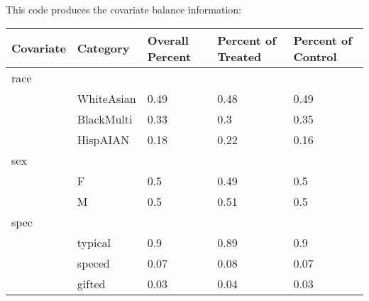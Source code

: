 \documentclass{article}
\begin{document}
This code produces the covariate balance information:
\begin{kframe}
\begin{alltt}
 \hlkwb{<-} 
  \hlstd{(}\hlstd{,}\hlstd{,}\hlstd{))\{}
     \hlkwb{<-} \hlstd{,}\hlstd{,}\hlstd{,}\hlstd{))}

      
         \hlkwb{<-} \hlstd{(}\hlstd{(}\hlstd{(}\hlopt{==}\hlstd{(dat[[i]][dat}\hlopt{$}\hlopt{==}\hlstd{]}\hlopt{==}\hlstd{(dat[[i]][dat}\hlopt{$}\hlopt{==}\hlstd{]}\hlopt{==}\hlstd{)))}

    \hlstd{\}}
\hlstd{\}}
 \hlkwb{<-} \hlstd{(}\hlstd{,}\hlstd{,}\hlstd{,}\hlstd{,}\hlstd{)}
\hlstd{(}\hlstd{=}\hlstd{,}\hlstd{=}\hlstd{)}
\end{alltt}
\end{kframe}%
\begin{tabular}{lllll}
  \hline
Covariate & Category & Overall Percent & Percent of Treated & Percent of Control \\ 
  \hline
race &  &  &  &  \\ 
   & WhiteAsian & 0.49 & 0.48 & 0.49 \\ 
   & BlackMulti & 0.33 & 0.3 & 0.35 \\ 
   & HispAIAN & 0.18 & 0.22 & 0.16 \\ 
  sex &  &  &  &  \\ 
   & F & 0.5 & 0.49 & 0.5 \\ 
   & M & 0.5 & 0.51 & 0.5 \\ 
  spec &  &  &  &  \\ 
   & typical & 0.9 & 0.89 & 0.9 \\ 
   & speced & 0.07 & 0.08 & 0.07 \\ 
   & gifted & 0.03 & 0.04 & 0.03 \\ 
   \hline
\end{tabular}
\end{document}
